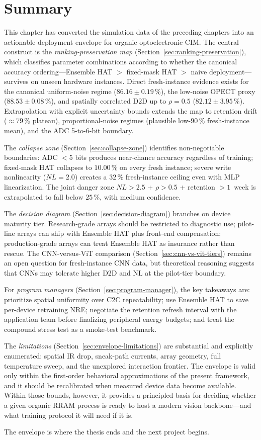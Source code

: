 \section{Summary}

This chapter has converted the simulation data of the preceding chapters into an actionable deployment envelope for organic optoelectronic CIM.  The central construct is the \emph{ranking-preservation map} (Section~\ref{sec:ranking-preservation}), which classifies parameter combinations according to whether the canonical accuracy ordering---Ensemble HAT $>$ fixed-mask HAT $>$ naive deployment---survives on unseen hardware instances.  Direct fresh-instance evidence exists for the canonical uniform-noise regime ($86.16\pm0.19\,\%$), the low-noise OPECT proxy ($88.53\pm0.08\,\%$), and spatially correlated D2D up to $\rho=0.5$ ($82.12\pm3.95\,\%$).  Extrapolation with explicit uncertainty bounds extends the map to retention drift ($\approx 79\,\%$ plateau), proportional-noise regimes (plausible low-$90\,\%$ fresh-instance mean), and the ADC 5-to-6-bit boundary.

The \emph{collapse zone} (Section~\ref{sec:collapse-zone}) identifies non-negotiable boundaries: ADC $< 5$ bits produces near-chance accuracy regardless of training; fixed-mask HAT collapses to $10.00\,\%$ on every fresh instance; severe write nonlinearity ($NL=2.0$) creates a $32\,\%$ fresh-instance ceiling even with MLP linearization.  The joint danger zone $NL > 2.5$ + $\rho > 0.5$ + retention $> 1$~week is extrapolated to fall below $25\,\%$, with medium confidence.

The \emph{decision diagram} (Section~\ref{sec:decision-diagram}) branches on device maturity tier.  Research-grade arrays should be restricted to diagnostic use; pilot-line arrays can ship with Ensemble HAT plus front-end compensation; production-grade arrays can treat Ensemble HAT as insurance rather than rescue.  The CNN-versus-ViT comparison (Section~\ref{sec:cnn-vs-vit-tiers}) remains an open question for fresh-instance CNN data, but theoretical reasoning suggests that CNNs may tolerate higher D2D and NL at the pilot-tier boundary.

For \emph{program managers} (Section~\ref{sec:program-manager}), the key takeaways are: prioritize spatial uniformity over C2C repeatability; use Ensemble HAT to save per-device retraining NRE; negotiate the retention refresh interval with the application team before finalizing peripheral energy budgets; and treat the compound stress test as a smoke-test benchmark.

The \emph{limitations} (Section~\ref{sec:envelope-limitations}) are substantial and explicitly enumerated: spatial IR drop, sneak-path currents, array geometry, full temperature sweep, and the unexplored interaction frontier.  The envelope is valid only within the first-order behavioral approximations of the present framework, and it should be recalibrated when measured device data become available.  Within those bounds, however, it provides a principled basis for deciding whether a given organic RRAM process is ready to host a modern vision backbone---and what training protocol it will need if it is.

The envelope is where the thesis ends and the next project begins.
